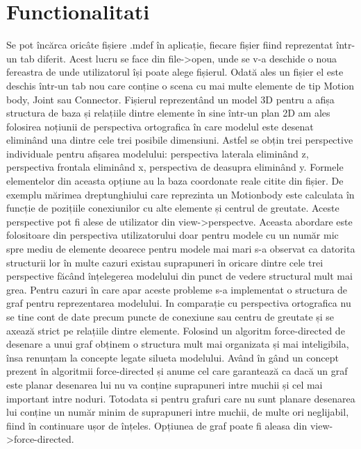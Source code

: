 \newpage
\section{Functionalitati}

Se pot încărca oricâte fișiere .mdef în aplicație, fiecare fișier fiind reprezentat într-un tab diferit. 
Acest lucru se face din file->open, unde se v-a deschide o noua fereastra de unde utilizatorul își poate alege fișierul. 
Odată ales un fișier el este deschis într-un tab nou care conține o scena cu mai multe elemente de tip Motion body, 
Joint sau Connector. Fișierul reprezentând un model 3D pentru a afișa structura de baza și relațiile dintre elemente 
în sine într-un plan 2D am ales folosirea noțiunii de perspectiva ortografica în care modelul este desenat eliminând 
una dintre cele trei posibile dimensiuni. Astfel se obțin trei perspective individuale pentru afișarea modelului: 
perspectiva laterala eliminând z, perspectiva frontala eliminând x, perspectiva de deasupra eliminând y. Formele 
elementelor din aceasta opțiune au la baza coordonate reale citite din fișier. De exemplu mărimea dreptunghiului 
care reprezinta un Motionbody este calculata în funcție de pozițiile conexiunilor cu alte elemente și centrul de 
greutate. Aceste perspective pot fi alese de utilizator din view->perspectve. Aceasta abordare este folositoare din 
perspectiva utilizatorului doar pentru modele cu un număr mic spre mediu de elemente deoarece pentru modele mai mari 
s-a observat ca datorita structurii lor în multe cazuri existau suprapuneri în oricare dintre cele trei perspective 
făcând înțelegerea modelului din punct de vedere structural mult mai grea. Pentru cazuri în care apar aceste probleme 
s-a implementat o structura de graf pentru reprezentarea modelului. In comparație cu perspectiva ortografica nu se tine 
cont de date precum puncte de conexiune sau centru de greutate și se axează strict pe relațiile dintre elemente. 
Folosind un algoritm force-directed de desenare a unui graf obținem o structura mult mai organizata și mai inteligibila, 
însa renunțam la concepte legate silueta modelului. Având în gând un concept prezent în algoritmii force-directed și anume 
cel care garantează ca dacă un graf este planar desenarea lui nu va conține suprapuneri intre muchii și cel mai important 
intre noduri. Totodata si pentru grafuri care nu sunt planare desenarea lui conține un număr minim de suprapuneri intre muchii, 
de multe ori neglijabil, fiind în continuare ușor de înțeles. Opțiunea de graf poate fi aleasa din view->force-directed. 
